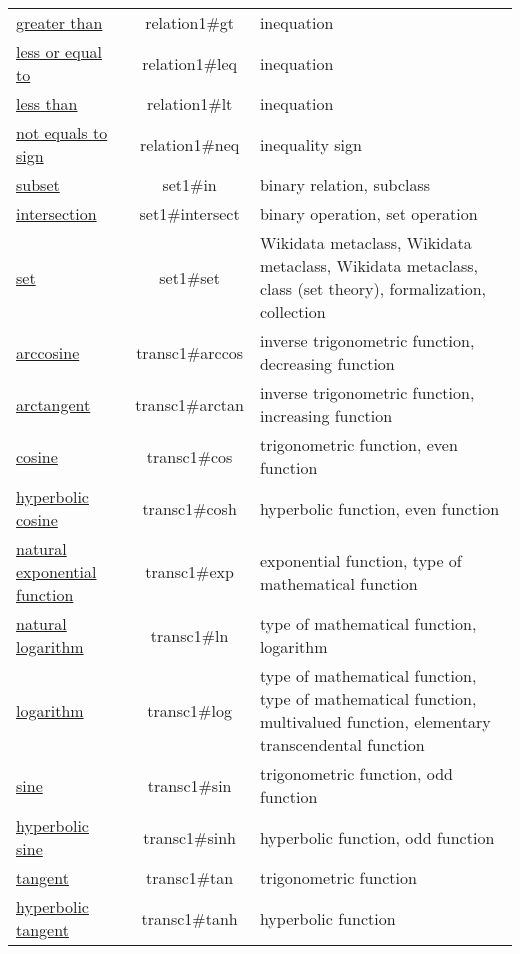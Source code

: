 \documentclass[a4paper]{article}
\begin{document}
\begin{table}[p]
\begin{tabular}{p{.23\linewidth}cp{.5\linewidth}}
\href{https://www.wikidata.org/entity/Q47035128}{greater than} & relation1\#gt & inequation \\
\href{https://www.wikidata.org/entity/Q55935272}{less or equal to} & relation1\#leq & inequation \\
\href{https://www.wikidata.org/entity/Q52834024}{less than} & relation1\#lt & inequation \\
\href{https://www.wikidata.org/entity/Q21778965}{not equals to sign} & relation1\#neq & inequality sign \\
\href{https://www.wikidata.org/entity/Q177646}{subset} & set1\#in & binary relation, subclass \\
\href{https://www.wikidata.org/entity/Q185837}{intersection} & set1\#intersect & binary operation, set operation \\
\href{https://www.wikidata.org/entity/Q36161}{set} & set1\#set & Wikidata metaclass, Wikidata metaclass, Wikidata metaclass, class (set theory), formalization, collection \\
\href{https://www.wikidata.org/entity/Q720341}{arccosine} & transc1\#arccos & inverse trigonometric function, decreasing function \\
\href{https://www.wikidata.org/entity/Q2257242}{arctangent} & transc1\#arctan & inverse trigonometric function, increasing function \\
\href{https://www.wikidata.org/entity/Q1256164}{cosine} & transc1\#cos & trigonometric function, even function \\
\href{https://www.wikidata.org/entity/Q1253682}{hyperbolic cosine} & transc1\#cosh & hyperbolic function, even function \\
\href{https://www.wikidata.org/entity/Q47306354}{natural exponential function} & transc1\#exp & exponential function, type of mathematical function \\
\href{https://www.wikidata.org/entity/Q204037}{natural logarithm} & transc1\#ln & type of mathematical function, logarithm \\
\href{https://www.wikidata.org/entity/Q11197}{logarithm} & transc1\#log & type of mathematical function, type of mathematical function, multivalued function, elementary transcendental function \\
\href{https://www.wikidata.org/entity/Q152415}{sine} & transc1\#sin & trigonometric function, odd function \\
\href{https://www.wikidata.org/entity/Q1292101}{hyperbolic sine} & transc1\#sinh & hyperbolic function, odd function \\
\href{https://www.wikidata.org/entity/Q1129196}{tangent} & transc1\#tan & trigonometric function \\
\href{https://www.wikidata.org/entity/Q1274703}{hyperbolic tangent} & transc1\#tanh & hyperbolic function \\
\end{tabular}
\end{table}
\end{document}
